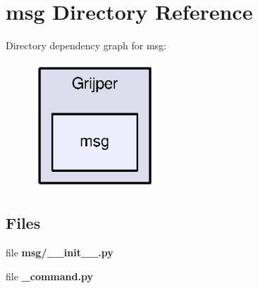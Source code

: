 \section{msg Directory Reference}
\label{dir_112a4e5e29dc0454b809dee860fd6fa7}
Directory dependency graph for msg\-:\nopagebreak
\begin{figure}[H]
\begin{center}
\leavevmode
\includegraphics[width=130pt]{dir_112a4e5e29dc0454b809dee860fd6fa7_dep}
\end{center}
\end{figure}
\subsection*{Files}
\begin{DoxyCompactItemize}
\item 
file {\bf msg/\-\_\-\-\_\-init\-\_\-\-\_\-.\-py}
\item 
file {\bf \-\_\-command.\-py}
\end{DoxyCompactItemize}
